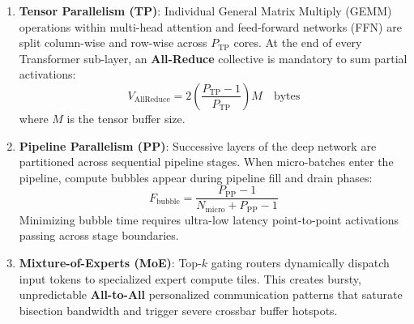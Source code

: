 \begin{enumerate}
    \item \textbf{Tensor Parallelism (TP)}: Individual General Matrix Multiply (GEMM) operations within multi-head attention and feed-forward networks (FFN) are split column-wise and row-wise across $P_{\mathrm{TP}}$ cores. At the end of every Transformer sub-layer, an \textbf{All-Reduce} collective is mandatory to sum partial activations:
    \begin{equation}
    V_{\mathrm{AllReduce}} = 2 \left( \frac{P_{\mathrm{TP}} - 1}{P_{\mathrm{TP}}} \right) M \quad \text{bytes}
    \label{eq:allreduce-volume}
    \end{equation}
    where $M$ is the tensor buffer size.
    
    \item \textbf{Pipeline Parallelism (PP)}: Successive layers of the deep network are partitioned across sequential pipeline stages. When micro-batches enter the pipeline, compute bubbles appear during pipeline fill and drain phases:
    \begin{equation}
    F_{\mathrm{bubble}} = \frac{P_{\mathrm{PP}} - 1}{N_{\mathrm{micro}} + P_{\mathrm{PP}} - 1}
    \end{equation}
    Minimizing bubble time requires ultra-low latency point-to-point activations passing across stage boundaries.
    
    \item \textbf{Mixture-of-Experts (MoE)}: Top-$k$ gating routers dynamically dispatch input tokens to specialized expert compute tiles. This creates bursty, unpredictable \textbf{All-to-All} personalized communication patterns that saturate bisection bandwidth and trigger severe crossbar buffer hotspots.
\end{enumerate}

